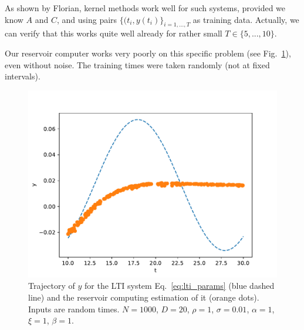\documentclass{article}
\begin{document}
As shown by Florian, kernel methods work well for such systems, provided we know $A$ and $C$, and using pairs $\{(t_i,y(t_i)\}_{i=1,...,T}$ as training data. 
Actually, we can verify that this works quite well already for rather small $T\in\{5,...,10\}$. 

Our reservoir computer works very poorly on this specific problem (see Fig.~\ref{fig:reservoir_lti_1}), even without noise. 
The training times were taken randomly (not at fixed intervals). 
\begin{figure}
 \centering
 \includegraphics[width=.5\textwidth]{figs/reservoir_lti_1.pdf}
 \caption{Trajectory of $y$ for the LTI system Eq.~\eqref{eq:lti_params} (blue dashed line) and the reservoir computing estimation of it (orange dots). 
 Inputs are random times. 
 $N=1000$, $D=20$, $\rho=1$, $\sigma=0.01$, $\alpha=1$, $\xi=1$, $\beta=1$. }
 \label{fig:reservoir_lti_1}
\end{figure}
\end{document}
